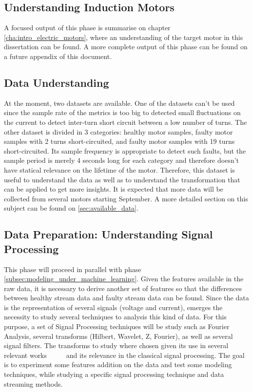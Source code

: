 \subsection{Understanding Induction Motors}

A focused output of this phase is summarise on chapter \ref{cha:intro_electric_motors}, where an understanding of the target motor in this dissertation can be found. A more complete output of this phase can be found on a future appendix of this document.


\subsection{Data Understanding}

At the moment, two datasets are available. One of the datasets can't be used since the sample rate of the metrics is too big to detected small fluctuations on the current to detect inter-turn short circuit between a low number of turns.
The other dataset is divided in 3 categories: healthy motor samples, faulty motor samples with 2 turns short-circuited, and faulty motor samples with 19 turns short-circuited. Its sample frequency is appropriate to detect such faults, but the sample period is merely 4 seconds long for each category and therefore doesn't have statical relevance on the lifetime of the motor. Therefore, this dataset is useful to understand the data as well as to understand the transformation that can be applied to get more insights.
It is expected that more data will be collected from several motors starting September. A more detailed section on this subject can be found on \ref{sec:available_data}.

\subsection{Data Preparation: Understanding Signal Processing}
\label{subsec:data_prep_studying_signal}

This phase will proceed in parallel with phase \ref{subsec:modeling_under_machine_learning}. Given the features available in the raw data, it is necessary to derive another set of features so that the differences between healthy stream data and faulty stream data can be found. Since the data is the representation of several signals (voltage and current), emerges the necessity to study several techniques to analysis this kind of data. For this purpose, a set of Signal Processing techniques will be study such as Fourier Analysis, several transforms (Hilbert, Wavelet, Z, Fourier), as well as several signal filters.
The transforms to study where chosen given its use in several relevant works ~\cite{M.a2014} ~\cite{Riera-Guasp2015} ~\cite{Cheng2011} and its relevance in the classical signal processing.
The goal is to experiment some features addition on the data and test some modeling techniques, while studying a specific signal processing technique and data streaming methods.

